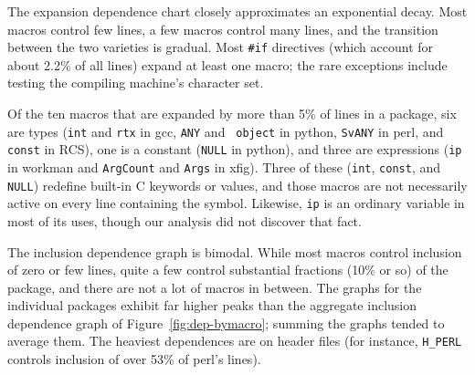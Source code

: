 \documentclass[10pt]{article}
\newcommand{\pkg}[1]{\textsf{#1}}
\begin{document}

The expansion dependence chart closely approximates an exponential decay.
Most macros control few lines, a few macros control many lines, and the
transition between the two varieties is gradual.  Most {\tt \#if}
directives (which account for about 2.2\% of all lines) expand at least one
macro; the rare exceptions include testing the compiling machine's
character set.

Of the ten macros that are expanded by more than 5\% of lines in a package,
six are types ({\tt int} and {\tt rtx} in \pkg{gcc}, {\tt ANY} and {\tt
object} in \pkg{python}, {\tt SvANY} in \pkg{perl}, and {\tt const} in
RCS), one is a constant ({\tt NULL} in python), and three are expressions
({\tt ip} in \pkg{workman} and {\tt ArgCount} and {\tt Args} in
\pkg{xfig}).  Three of these ({\tt int}, {\tt const}, and {\tt NULL})
redefine built-in C keywords or values, and those macros are not
necessarily active on every line containing the symbol.  Likewise, {\tt ip}
is an ordinary variable in most of its uses, though our analysis did not
discover that fact.

% 
% 



The inclusion dependence graph is bimodal.  While most macros control
inclusion of zero or few lines, quite a few control substantial
fractions (10\% or so) of the package, and there are not a lot of macros in
between.  The graphs for the individual packages exhibit far higher peaks
than the aggregate inclusion dependence graph of
Figure~\ref{fig:dep-bymacro}; summing the graphs tended to average them.
The heaviest dependences are on header files (for instance, \verb|H_PERL|
controls inclusion of over 53\% of \pkg{perl}'s lines).

\end{document}
